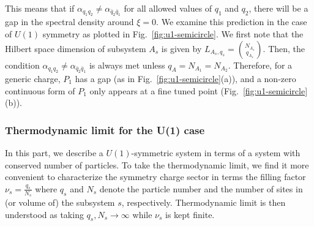 \documentclass[aps,pra,reprint,superscriptaddress,twocolumn,notitlepage]{revtex4-1}
\numberwithin{equation}{section}
\begin{document}
This means that if $\alpha_{q_1 q_2} \neq \alpha_{\bar{q}_2 \bar{q}_1}$ for all allowed values of $q_1$ and $q_2$, there will be a gap in the spectral density around $\xi=0$.
We examine this prediction in the case of $U(1)$ symmetry as plotted in Fig.~\ref{fig:u1-semicircle}. We first note that the Hilbert space dimension of subsystem $A_s$ is given by
$L_{A_s,q_s} = \binom{N_{A_s}}{q_{A_s}}$. 
Then, the condition $\alpha_{q_1 q_2} \neq \alpha_{\bar{q}_2 \bar{q}_1}$ is always met unless $q_A = N_{A_1}=N_{A_2}$. Therefore, for a generic charge, $P_1$ has a gap (as in Fig.~\ref{fig:u1-semicircle}(a)), and a non-zero continuous form of $P_1$ only appears at a fine tuned point (Fig.~\ref{fig:u1-semicircle}(b)). 


\subsubsection{Thermodynamic limit for the U(1) case}\label{sec:thermo_limit_U(1)_plateau}


In this part, we describe a $U(1)$-symmetric system in terms of a system with conserved number of particles. To take the thermodynamic limit, we find it more convenient to 
characterize the symmetry charge sector in terms the filling factor $\nu_s = \frac{q_s}{N_s}$ where $q_s$ and $N_s$ denote the particle number and the number of sites in (or volume of) the subsystem $s$, respectively. Thermodynamic limit is then understood as taking $q_s,N_s\to \infty$ while $\nu_s$ is kept finite.
 
\end{document}
